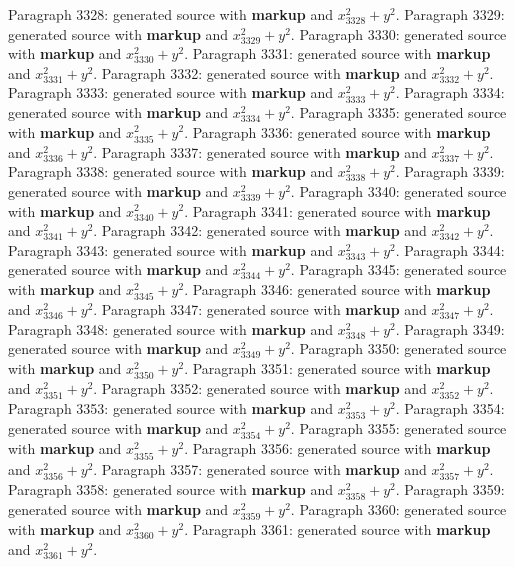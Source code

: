 \documentclass{article}
\begin{document}
Paragraph 3328: generated source with \textbf{markup} and $x_{3328}^2 + y^2$.
Paragraph 3329: generated source with \textbf{markup} and $x_{3329}^2 + y^2$.
Paragraph 3330: generated source with \textbf{markup} and $x_{3330}^2 + y^2$.
Paragraph 3331: generated source with \textbf{markup} and $x_{3331}^2 + y^2$.
Paragraph 3332: generated source with \textbf{markup} and $x_{3332}^2 + y^2$.
Paragraph 3333: generated source with \textbf{markup} and $x_{3333}^2 + y^2$.
Paragraph 3334: generated source with \textbf{markup} and $x_{3334}^2 + y^2$.
Paragraph 3335: generated source with \textbf{markup} and $x_{3335}^2 + y^2$.
Paragraph 3336: generated source with \textbf{markup} and $x_{3336}^2 + y^2$.
Paragraph 3337: generated source with \textbf{markup} and $x_{3337}^2 + y^2$.
Paragraph 3338: generated source with \textbf{markup} and $x_{3338}^2 + y^2$.
Paragraph 3339: generated source with \textbf{markup} and $x_{3339}^2 + y^2$.
Paragraph 3340: generated source with \textbf{markup} and $x_{3340}^2 + y^2$.
Paragraph 3341: generated source with \textbf{markup} and $x_{3341}^2 + y^2$.
Paragraph 3342: generated source with \textbf{markup} and $x_{3342}^2 + y^2$.
Paragraph 3343: generated source with \textbf{markup} and $x_{3343}^2 + y^2$.
Paragraph 3344: generated source with \textbf{markup} and $x_{3344}^2 + y^2$.
Paragraph 3345: generated source with \textbf{markup} and $x_{3345}^2 + y^2$.
Paragraph 3346: generated source with \textbf{markup} and $x_{3346}^2 + y^2$.
Paragraph 3347: generated source with \textbf{markup} and $x_{3347}^2 + y^2$.
Paragraph 3348: generated source with \textbf{markup} and $x_{3348}^2 + y^2$.
Paragraph 3349: generated source with \textbf{markup} and $x_{3349}^2 + y^2$.
Paragraph 3350: generated source with \textbf{markup} and $x_{3350}^2 + y^2$.
Paragraph 3351: generated source with \textbf{markup} and $x_{3351}^2 + y^2$.
Paragraph 3352: generated source with \textbf{markup} and $x_{3352}^2 + y^2$.
Paragraph 3353: generated source with \textbf{markup} and $x_{3353}^2 + y^2$.
Paragraph 3354: generated source with \textbf{markup} and $x_{3354}^2 + y^2$.
Paragraph 3355: generated source with \textbf{markup} and $x_{3355}^2 + y^2$.
Paragraph 3356: generated source with \textbf{markup} and $x_{3356}^2 + y^2$.
Paragraph 3357: generated source with \textbf{markup} and $x_{3357}^2 + y^2$.
Paragraph 3358: generated source with \textbf{markup} and $x_{3358}^2 + y^2$.
Paragraph 3359: generated source with \textbf{markup} and $x_{3359}^2 + y^2$.
Paragraph 3360: generated source with \textbf{markup} and $x_{3360}^2 + y^2$.
Paragraph 3361: generated source with \textbf{markup} and $x_{3361}^2 + y^2$.
\end{document}
